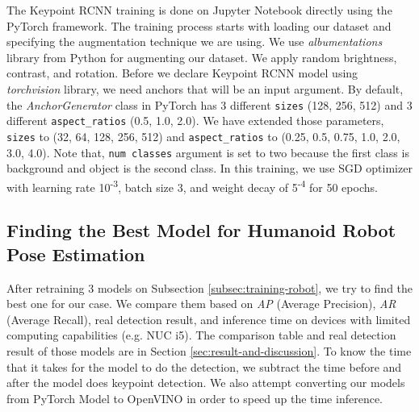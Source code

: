 The Keypoint RCNN training is done on Jupyter Notebook directly using the PyTorch framework.
The training process starts with loading our dataset and specifying the augmentation technique we are using. We use \emph{albumentations} library from Python for augmenting our dataset.
We apply random brightness, contrast, and rotation.
Before we declare Keypoint RCNN model using \emph{torchvision} library, we need anchors that will be an input argument. 
By default, the \emph{AnchorGenerator} class in PyTorch has 3 different \verb|sizes| (128, 256, 512) and 3 different \verb|aspect_ratios| (0.5, 1.0, 2.0).
We have extended those parameters, \verb|sizes| to (32, 64, 128, 256, 512) and \verb|aspect_ratios| to (0.25, 0.5, 0.75, 1.0, 2.0, 3.0, 4.0).
Note that, \verb|num classes| argument is set to two because the first class is background and object is the second class.
In this training, we use SGD optimizer with learning rate 10\textsuperscript{-3}, batch size 3, and weight decay of 5\textsuperscript{-4} for 50 epochs.


\subsection{Finding the Best Model for Humanoid Robot Pose Estimation}
\label{subsec:finding-best-model-humanoid-robot}

After retraining 3 models on Subsection \ref{subsec:training-robot}, we try to find the best one for our case. We compare them based on \emph{AP} (Average Precision), \emph{AR} (Average Recall),
real detection result, and inference time on devices with limited computing capabilities (e.g. NUC i5).
The comparison table and real detection result of those models are in Section \ref{sec:result-and-discussion}.
To know the time that it takes for the model to do the detection, we subtract the time before and after the model does keypoint detection.
We also attempt converting our models from PyTorch Model to OpenVINO in order to speed up the time inference.

